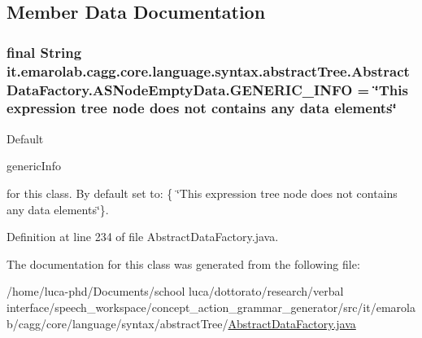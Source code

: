 \subsection{Member Data Documentation}
\hypertarget{classit_1_1emarolab_1_1cagg_1_1core_1_1language_1_1syntax_1_1abstractTree_1_1AbstractDataFactory_1_1ASNodeEmptyData_a4e40031c94fe7c1b692dffaf93abfd54}{
\subsubsection[{G\-E\-N\-E\-R\-I\-C\-\_\-\-I\-N\-F\-O}]{\setlength{\rightskip}{0pt plus 5cm}final String it.\-emarolab.\-cagg.\-core.\-language.\-syntax.\-abstract\-Tree.\-Abstract\-Data\-Factory.\-A\-S\-Node\-Empty\-Data.\-G\-E\-N\-E\-R\-I\-C\-\_\-\-I\-N\-F\-O = \char`\"{}This expression tree node does not contains any data elements\char`\"{}\hspace{0.3cm}{\ttfamily [static]}}}\label{classit_1_1emarolab_1_1cagg_1_1core_1_1language_1_1syntax_1_1abstractTree_1_1AbstractDataFactory_1_1ASNodeEmptyData_a4e40031c94fe7c1b692dffaf93abfd54}
Default
\begin{DoxyCode}
genericInfo 
\end{DoxyCode}
 for this class. By default set to\-: \{ \char`\"{}\-This expression tree node does not contains any data elements\char`\"{}\}. 

Definition at line 234 of file Abstract\-Data\-Factory.\-java.



The documentation for this class was generated from the following file\-:\begin{DoxyCompactItemize}
\item 
/home/luca-\/phd/\-Documents/school luca/dottorato/research/verbal interface/speech\-\_\-workspace/concept\-\_\-action\-\_\-grammar\-\_\-generator/src/it/emarolab/cagg/core/language/syntax/abstract\-Tree/\hyperlink{AbstractDataFactory_8java}{Abstract\-Data\-Factory.\-java}\end{DoxyCompactItemize}
